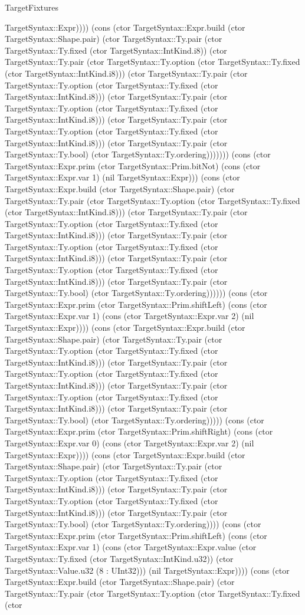 \begin{lexlean}{TargetFixtures}
\begin{semanticmodule}
{TargetSyntax::Expr)))) (cons (ctor TargetSyntax::Expr.build (ctor TargetSyntax::Shape.pair) (ctor TargetSyntax::Ty.pair (ctor TargetSyntax::Ty.fixed (ctor TargetSyntax::IntKind.i8)) (ctor TargetSyntax::Ty.pair (ctor TargetSyntax::Ty.option (ctor TargetSyntax::Ty.fixed (ctor TargetSyntax::IntKind.i8))) (ctor TargetSyntax::Ty.pair (ctor TargetSyntax::Ty.option (ctor TargetSyntax::Ty.fixed (ctor TargetSyntax::IntKind.i8))) (ctor TargetSyntax::Ty.pair (ctor TargetSyntax::Ty.option (ctor TargetSyntax::Ty.fixed (ctor TargetSyntax::IntKind.i8))) (ctor TargetSyntax::Ty.pair (ctor TargetSyntax::Ty.option (ctor TargetSyntax::Ty.fixed (ctor TargetSyntax::IntKind.i8))) (ctor TargetSyntax::Ty.pair (ctor TargetSyntax::Ty.bool) (ctor TargetSyntax::Ty.ordering))))))) (cons (ctor TargetSyntax::Expr.prim (ctor TargetSyntax::Prim.bitNot) (cons (ctor TargetSyntax::Expr.var 1) (nil TargetSyntax::Expr))) (cons (ctor TargetSyntax::Expr.build (ctor TargetSyntax::Shape.pair) (ctor TargetSyntax::Ty.pair (ctor TargetSyntax::Ty.option (ctor TargetSyntax::Ty.fixed (ctor TargetSyntax::IntKind.i8))) (ctor TargetSyntax::Ty.pair (ctor TargetSyntax::Ty.option (ctor TargetSyntax::Ty.fixed (ctor TargetSyntax::IntKind.i8))) (ctor TargetSyntax::Ty.pair (ctor TargetSyntax::Ty.option (ctor TargetSyntax::Ty.fixed (ctor TargetSyntax::IntKind.i8))) (ctor TargetSyntax::Ty.pair (ctor TargetSyntax::Ty.option (ctor TargetSyntax::Ty.fixed (ctor TargetSyntax::IntKind.i8))) (ctor TargetSyntax::Ty.pair (ctor TargetSyntax::Ty.bool) (ctor TargetSyntax::Ty.ordering)))))) (cons (ctor TargetSyntax::Expr.prim (ctor TargetSyntax::Prim.shiftLeft) (cons (ctor TargetSyntax::Expr.var 1) (cons (ctor TargetSyntax::Expr.var 2) (nil TargetSyntax::Expr)))) (cons (ctor TargetSyntax::Expr.build (ctor TargetSyntax::Shape.pair) (ctor TargetSyntax::Ty.pair (ctor TargetSyntax::Ty.option (ctor TargetSyntax::Ty.fixed (ctor TargetSyntax::IntKind.i8))) (ctor TargetSyntax::Ty.pair (ctor TargetSyntax::Ty.option (ctor TargetSyntax::Ty.fixed (ctor TargetSyntax::IntKind.i8))) (ctor TargetSyntax::Ty.pair (ctor TargetSyntax::Ty.option (ctor TargetSyntax::Ty.fixed (ctor TargetSyntax::IntKind.i8))) (ctor TargetSyntax::Ty.pair (ctor TargetSyntax::Ty.bool) (ctor TargetSyntax::Ty.ordering))))) (cons (ctor TargetSyntax::Expr.prim (ctor TargetSyntax::Prim.shiftRight) (cons (ctor TargetSyntax::Expr.var 0) (cons (ctor TargetSyntax::Expr.var 2) (nil TargetSyntax::Expr)))) (cons (ctor TargetSyntax::Expr.build (ctor TargetSyntax::Shape.pair) (ctor TargetSyntax::Ty.pair (ctor TargetSyntax::Ty.option (ctor TargetSyntax::Ty.fixed (ctor TargetSyntax::IntKind.i8))) (ctor TargetSyntax::Ty.pair (ctor TargetSyntax::Ty.option (ctor TargetSyntax::Ty.fixed (ctor TargetSyntax::IntKind.i8))) (ctor TargetSyntax::Ty.pair (ctor TargetSyntax::Ty.bool) (ctor TargetSyntax::Ty.ordering)))) (cons (ctor TargetSyntax::Expr.prim (ctor TargetSyntax::Prim.shiftLeft) (cons (ctor TargetSyntax::Expr.var 1) (cons (ctor TargetSyntax::Expr.value (ctor TargetSyntax::Ty.fixed (ctor TargetSyntax::IntKind.u32)) (ctor TargetSyntax::Value.u32 (8 : UInt32))) (nil TargetSyntax::Expr)))) (cons (ctor TargetSyntax::Expr.build (ctor TargetSyntax::Shape.pair) (ctor TargetSyntax::Ty.pair (ctor TargetSyntax::Ty.option (ctor TargetSyntax::Ty.fixed (ctor }
\end{semanticmodule}
\end{lexlean}
